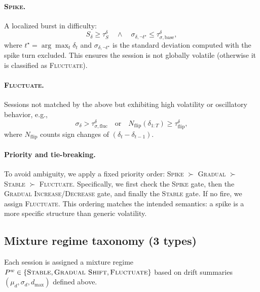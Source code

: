 \paragraph{\textsc{Spike}.}
A localized burst in difficulty:
\begin{equation}
\label{eq:pat_spike}
S_\delta \ge \tau_{S}^{\delta}
\quad \wedge \quad
\sigma_{\delta,\neg t^\star} \le \tau_{\sigma,\mathrm{base}}^{\delta},
\end{equation}
where $t^\star=\arg\max_t \delta_t$ and $\sigma_{\delta,\neg t^\star}$ is the standard deviation computed with the spike turn excluded. This ensures the session is not globally volatile (otherwise it is classified as \textsc{Fluctuate}).

\paragraph{\textsc{Fluctuate}.}
Sessions not matched by the above but exhibiting high volatility or oscillatory behavior, e.g.,
\begin{equation}
\label{eq:pat_fluct}
\sigma_\delta > \tau_{\sigma,\mathrm{fluc}}^{\delta}
\quad \text{or} \quad
N_{\mathrm{flip}}\left(\delta_{1:T}\right) \ge \tau_{\mathrm{flip}}^{\delta},
\end{equation}
where $N_{\mathrm{flip}}$ counts sign changes of $\left(\delta_t-\delta_{t-1}\right)$.

\paragraph{Priority and tie-breaking.}
To avoid ambiguity, we apply a fixed priority order: \textsc{Spike} $\succ$ \textsc{Gradual} $\succ$ \textsc{Stable} $\succ$ \textsc{Fluctuate}.
Specifically, we first check the \textsc{Spike} gate, then the \textsc{Gradual Increase/Decrease} gate, and finally the \textsc{Stable} gate. If no fire, we assign \textsc{Fluctuate}.
This ordering matches the intended semantics: a spike is a more specific structure than generic volatility.

\subsection{Mixture regime taxonomy (3 types)}
\label{app:pattern_mixture}

Each session is assigned a mixture regime $P^w \in \{\textsc{Stable},\textsc{Gradual Shift},\textsc{Fluctuate}\}$ based on drift summaries $\left(\mu_d,\sigma_d,d_{\max}\right)$ defined above.

